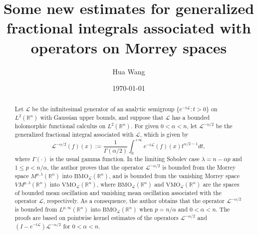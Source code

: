 \documentclass[10pt, reqno]{amsart}
\theoremstyle{definition}
\theoremstyle{remark}
\numberwithin{equation}{section}
\begin{document}
\setcounter{page}{1}

\title[Generalized fractional integrals on Morrey spaces]
{Some new estimates for generalized fractional integrals associated with operators on Morrey spaces}

\author[Hua Wang]{Hua Wang}

\address{School of Mathematics and Information Science, Xiangnan University,
Chenzhou 423000, P. R. China}
\email{\textcolor[rgb]{0.00,0.00,0.84}{wanghua@pku.edu.cn}}




\date{\today}

\begin{abstract}
Let $\mathcal{L}$ be the infinitesimal generator of an analytic semigroup $\big\{e^{-t\mathcal L}:t>0\big\}$ on $L^2(\mathbb R^n)$ with Gaussian upper bounds, and suppose that $\mathcal{L}$ has a bounded holomorphic functional calculus on $L^2(\mathbb R^n)$. For given $0<\alpha<n$, let $\mathcal L^{-\alpha/2}$ be the generalized fractional integral associated with $\mathcal{L}$, which is given by
\begin{equation*}
\mathcal L^{-\alpha/2}(f)(x):=\frac{1}{\Gamma(\alpha/2)}\int_0^{+\infty}e^{-t\mathcal L}(f)(x)t^{\alpha/2-1}dt,
\end{equation*}
where $\Gamma(\cdot)$ is the usual gamma function. In the limiting Sobolev case $\lambda=n-\alpha p$ and $1\leq p<n/{\alpha}$, the author proves that the operator $\mathcal{L}^{-\alpha/2}$ is bounded from the Morrey space $M^{p,\lambda}(\mathbb R^n)$ into $\mathrm{BMO}_{\mathcal{L}}(\mathbb R^n)$, and is bounded from the vanishing Morrey space $VM^{p,\lambda}(\mathbb R^n)$ into $\mathrm{VMO}_{\mathcal{L}}(\mathbb R^n)$, where $\mathrm{BMO}_{\mathcal{L}}(\mathbb R^n)$ and $\mathrm{VMO}_{\mathcal{L}}(\mathbb R^n)$ are the spaces of bounded mean oscillation and vanishing mean oscillation associated with the operator $\mathcal{L}$, respectively. As a consequence, the author obtains that the operator $\mathcal{L}^{-\alpha/2}$ is bounded from $L^{p,\infty}(\mathbb R^n)$ into $\mathrm{BMO}_{\mathcal{L}}(\mathbb R^n)$ when $p=n/{\alpha}$ and $0<\alpha<n$. The proofs are based on pointwise kernel estimates of the operators $\mathcal L^{-\alpha/2}$ and $(I-e^{-t\mathcal L})\mathcal{L}^{-\alpha/2}$ for $0<\alpha<n$.
\end{abstract}
\end{document}
